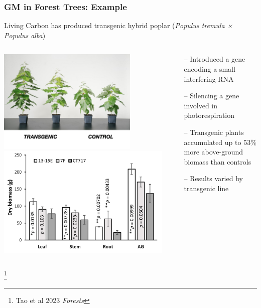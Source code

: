 \documentclass[xcolor=dvipsnames]{beamer}
\newcommand\blfootnote[1]{%
	\begingroup
	\renewcommand\thefootnote{}\footnote{#1}%
	\addtocounter{footnote}{-1}%
	\endgroup
}
\begin{document}
\begin{frame}
	\frametitle{GM in Forest Trees: Example}
	
	Living Carbon has produced transgenic hybrid poplar (\textit{Populus tremula × Populus alba})  \\
	

	
	\begin{columns}
		\begin{column}{0.4\textwidth}
			\centering	\includegraphics[keepaspectratio, width  = 0.8\textwidth]{img/livingCarbon}\\
						\centering	\includegraphics[keepaspectratio, width  = \textwidth]{img/livingCarbonResult}
		\end{column}
		\begin{column}{0.5\textwidth}
			\begin{itemize}
				\item[--] Introduced a gene encoding a small interfering RNA
				\item[--] Silencing a gene involved in photorespiration
				\item[--] Transgenic plants accumulated  up to 53\% more above-ground biomass than controls
				\item[--] Results varied by transgenic line
			\end{itemize}			
		\end{column}
	\end{columns}
	\blfootnote{Tao et al 2023 \textit{Forests}}
	
\end{frame}
\end{document}
